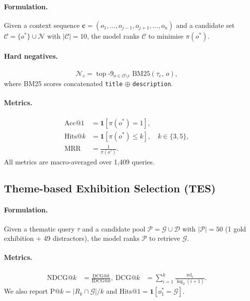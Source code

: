 \documentclass[11pt]{article}
\newcommand{\tes}{\textsc{TES}}
\begin{document}
\paragraph{Formulation.}
Given a context sequence $\mathbf{c} = (o_1,\ldots,o_{j-1},o_{j+1},\ldots,o_n)$
and a candidate set $\mathcal{C} = \{o^*\} \cup \mathcal{N}$ with
$|\mathcal{C}| = 10$, the model ranks $\mathcal{C}$ to minimise
$\pi(o^*)$.

\paragraph{Hard negatives.}
\begin{equation}
\mathcal{N}_e = \operatorname*{top}\text{-}9_{o \in \mathcal{O} \setminus e}
\; \mathrm{BM25}(\tau_e,\, o),
\label{eq:negatives}
\end{equation}
where BM25 scores concatenated \texttt{title} $\oplus$ \texttt{description}.

\paragraph{Metrics.}
\begin{align}
\text{Acc@1}  &= \mathbf{1}[\pi(o^*) = 1], \label{eq:acc1}\\
\text{Hits@}k &= \mathbf{1}[\pi(o^*) \le k], \quad k \in \{3, 5\}, \label{eq:hitsk}\\
\text{MRR}    &= \tfrac{1}{\pi(o^*)}. \label{eq:mrr}
\end{align}
All metrics are macro-averaged over 1{,}409 queries.

\subsection{Theme-based Exhibition Selection (\tes{})}
\label{sec:tes}

\paragraph{Formulation.}
Given a thematic query $\tau$ and a candidate pool
$\mathcal{P} = \mathcal{G} \cup \mathcal{D}$ with $|\mathcal{P}| = 50$
(1 gold exhibition $+$ 49 distractors), the model ranks $\mathcal{P}$ to
retrieve $\mathcal{G}$.

\paragraph{Metrics.}
\begin{align}
\text{NDCG@}k &= \frac{\mathrm{DCG@}k}{\mathrm{IDCG@}k}, \nonumber\
\mathrm{DCG@}k &= \sum_{i=1}^{k}\frac{\mathrm{rel}_i}{\log_2(i+1)}.
    \label{eq:ndcg}
\end{align}
We also report $\text{P@}k = |R_k \cap \mathcal{G}|/k$ and $\text{Hits@1} = \mathbf{1}[o_1^* = \mathcal{G}]$.
\end{document}
